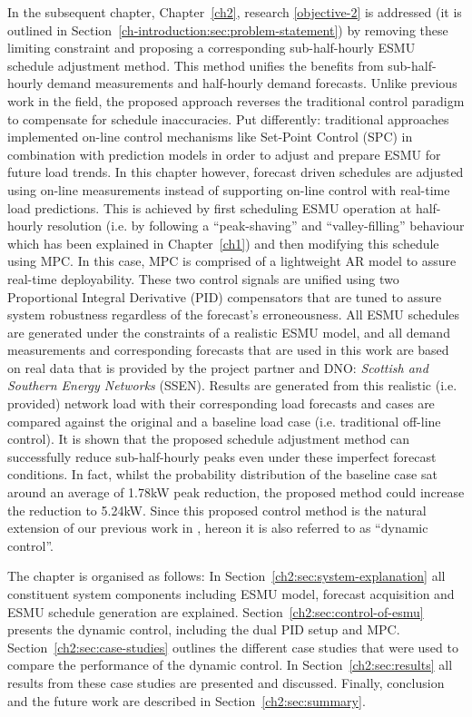 In the subsequent chapter, Chapter~\ref{ch2}, research \ref{objective-2} is addressed (it is outlined in Section~\ref{ch-introduction:sec:problem-statement}) by removing these limiting constraint and proposing a corresponding sub-half-hourly ESMU schedule adjustment method.
This method unifies the benefits from sub-half-hourly demand measurements and half-hourly demand forecasts.
Unlike previous work in the field, the proposed approach reverses the traditional control paradigm to compensate for schedule inaccuracies.
Put differently: traditional approaches implemented on-line control mechanisms like Set-Point Control (SPC) in combination with prediction models in order to adjust and prepare ESMU for future load trends.
In this chapter however, forecast driven schedules are adjusted using on-line measurements instead of supporting on-line control with real-time load predictions.
This is achieved by first scheduling ESMU operation at half-hourly resolution (i.e. by following a ``peak-shaving'' and ``valley-filling'' behaviour which has been explained in Chapter~\ref{ch1}) and then modifying this schedule using MPC.
In this case, MPC is comprised of a lightweight AR model to assure real-time deployability.
These two control signals are unified using two Proportional Integral Derivative (PID) compensators that are tuned to assure system robustness regardless of the forecast's erroneousness.
All ESMU schedules are generated under the constraints of a realistic ESMU model, and all demand measurements and corresponding forecasts that are used in this work are based on real data that is provided by the project partner and DNO: \textit{Scottish and Southern Energy Networks} (SSEN).
Results are generated from this realistic (i.e. provided) network load with their corresponding load forecasts and cases are compared against the original and a baseline load case (i.e. traditional off-line control).
It is shown that the proposed schedule adjustment method can successfully reduce sub-half-hourly peaks even under these imperfect forecast conditions.
In fact, whilst the probability distribution of the baseline case sat around an average of 1.78kW peak reduction, the proposed method could increase the reduction to 5.24kW.
Since this proposed control method is the natural extension of our previous work in \cite{Zangs2016}, hereon it is also referred to as ``dynamic control''.

The chapter is organised as follows:
In Section~\ref{ch2:sec:system-explanation} all constituent system components including ESMU model, forecast acquisition and ESMU schedule generation are explained.
Section~\ref{ch2:sec:control-of-esmu} presents the dynamic control, including the dual PID setup and MPC.
Section~\ref{ch2:sec:case-studies} outlines the different case studies that were used to compare the performance of the dynamic control.
In Section~\ref{ch2:sec:results} all results from these case studies are presented and discussed.
Finally, conclusion and the future work are described in Section~\ref{ch2:sec:summary}.










